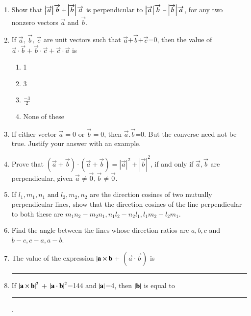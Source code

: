 \begin{enumerate}[label=\thesubsection.\arabic*,ref=\thesubsection.\theenumi]
	\\
	\solution
		
\item Show that $\left\vert\overrightarrow {a}\right\vert\overrightarrow {b}+\left\vert\overrightarrow {b}\right\vert\overrightarrow {a}$ is perpendicular to $\left\vert\overrightarrow {a}\right\vert \overrightarrow {b}-\left\vert\overrightarrow {b}\right\vert \overrightarrow {a}$, for any two nonzero vectors $\overrightarrow {a}$ and $\overrightarrow {b}$.
	\\
	\solution
		
\item If $\vec{a}$, $\vec{b}$, $\vec{c}$ are unit vectors such that $\vec{a}$+$\vec{b}$+$\vec{c}$=0, then the value of $\vec{a} \cdot \vec{b}+\vec{b} \cdot \vec{c}+\vec{c} \cdot \vec{a}$ is
	\begin{enumerate}
\item 1
\item 3
\item $\frac{-3}{2}$
\item None of these
\end{enumerate}
	\solution
		
\item If either vector $\overrightarrow {a}=0$ or $\overrightarrow {b}=0$, then $\overrightarrow {a}.\overrightarrow {b}$=0. But the converse need not be true. Justify your answer with an example.
	\\
	\solution
		
\item Prove that $(\vec{a}+\vec{b})\cdot(\vec{a}+\vec{b})=|{\vec{a}}|^2+|{\vec{b}}|^2$, if and only if $\vec{a}, \vec{b}$ are perpendicular, given $\vec{a}\neq\vec{0}, \vec{b}\neq\vec{0}$.\\
	\solution
		
	\item  If $l_1, m_1,n_1 \text{ and } l_2,m_2,n_2$ are the direction cosines of two mutually perpendicular lines, show that the direction cosines of the line perpendicular to both these are  $m_1n_2-m_2n_1,n_1l_2-n_2l_1,l_1m_2-l_2m_1$.
\\
    \solution
		
\item
Find the angle between the lines whose direction ratios are $a,b,c$ and $b-c,c-a,a-b$.
\\
\solution

\item The value of the expression $\left\vert\mathbf{a}\times\mathbf{b}\right\vert$+ $({\vec{a}\cdot\vec{b}})$ is \rule{1cm}{0.15mm}
\item If $\left\vert\mathbf{a}\times\mathbf{b}\right\vert^2$ + $\left\vert\mathbf{a}\cdot\mathbf{b}\right\vert^2$=144 $\text{and}$  $\left\vert\mathbf{a}\right\vert$=4, then $\left\vert\mathbf{b}\right\vert$ is equal to \rule{1cm}{0.15mm}.

\end{enumerate}
